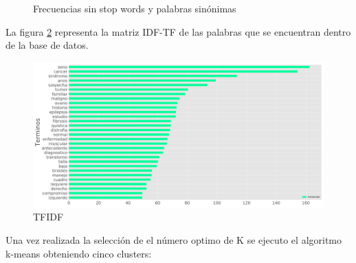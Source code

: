 \begin{figure}[H]
	\centering
	\caption{Frecuencias sin stop words y palabras sinónimas} \label{fig:sin}
\end{figure} 

La figura \ref{fig:IDFTF} representa la matriz IDF-TF de las palabras que se encuentran dentro de la base de datos.  

\begin{figure}[] 
	\centering
	\includegraphics[width=1\textwidth]{Kap4/tfidf.pdf}
	\caption{TFIDF} 
	\label{fig:IDFTF}
\end{figure}

Una vez realizada la selección de el número optimo de K se ejecuto el algoritmo k-means obteniendo cinco clusters:

